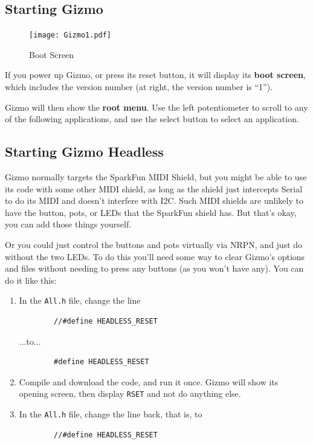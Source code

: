 \documentclass{article}
\begin{document}
\subsection{Starting Gizmo}

\begin{figure}
\vspace{-1.5em}\texttt{[image: Gizmo1.pdf]}
\vspace{-2em}\caption{\small Boot Screen}\vspace{-2em}
\label{BootScreen}
\end{figure}

If you power up Gizmo, or press its reset button, it will display its {\bf boot screen}, which includes the version number (at right, the version number is ``1'').

Gizmo will then show the {\bf root menu}.  Use the left potentiometer to scroll to any of the following applications, and use the select button to select an application.  

\subsection{Starting Gizmo Headless}

Gizmo normally targets the SparkFun MIDI Shield, but you might be able to use its code with some other MIDI shield, as long as the shield just intercepts Serial to do its MIDI and doesn't interfere with I2C.  Such MIDI shields are unlikely to have the button, pots, or LEDs that the SparkFun shield has.  But that's okay, you can add those things yourself.  

Or you could just control the buttons and pots virtually via NRPN, and just do without the two LEDs.  To do this you'll need some way to clear Gizmo's options and files without needing to press any buttons (as you won't have any).  You can do it like this:

\begin{enumerate}
\item In the \texttt{All.h} file, change the line 
\begin{verbatim}
        //#define HEADLESS_RESET
\end{verbatim}
...to...
\begin{verbatim}
        #define HEADLESS_RESET
\end{verbatim}
\item Compile and download the code, and run it once.  Gizmo will show its opening screen, then display \texttt{RSET} and not do anything else.
\item In the \texttt{All.h} file, change the line back, that is, to 
\begin{verbatim}
        //#define HEADLESS_RESET
\end{verbatim}

\end{enumerate}
\end{document}
